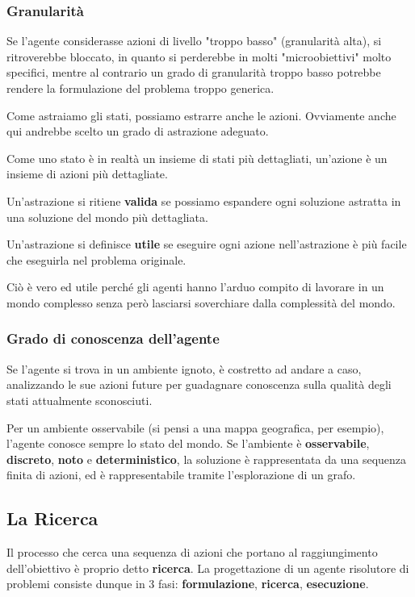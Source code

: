         \subsubsection{Granularità}
            Se l'agente considerasse azioni di livello "troppo basso" (granularità alta), si ritroverebbe bloccato, in quanto si perderebbe in molti "microobiettivi" molto specifici, mentre al contrario un grado di granularità troppo basso potrebbe rendere la formulazione del problema troppo generica.
            
            Come astraiamo gli stati, possiamo estrarre anche le azioni. Ovviamente anche qui andrebbe scelto un grado di astrazione adeguato.
            
            Come uno stato è in realtà un insieme di stati più dettagliati, un'azione è un insieme di azioni più dettagliate.
            
            Un'astrazione si ritiene \textbf{valida} se possiamo espandere ogni soluzione astratta in una soluzione del mondo più dettagliata.
            
            Un'astrazione si definisce \textbf{utile} se eseguire ogni azione nell'astrazione è più facile che eseguirla nel problema originale.
            
            Ciò è vero ed utile perché gli agenti hanno l'arduo compito di lavorare in un mondo complesso senza però lasciarsi soverchiare dalla complessità del mondo.
            
        \subsubsection{Grado di conoscenza dell'agente}
            Se l'agente si trova in un ambiente ignoto, è costretto ad andare a caso, analizzando le sue azioni future per guadagnare conoscenza sulla qualità degli stati attualmente sconosciuti.
            
            Per un ambiente osservabile (si pensi a una mappa geografica, per esempio), l'agente conosce sempre lo stato del mondo. Se l'ambiente è \textbf{osservabile}, \textbf{discreto}, \textbf{noto} e \textbf{deterministico}, la soluzione è rappresentata da una sequenza finita di azioni, ed è rappresentabile tramite l'esplorazione di un grafo.
            
    \subsection{La Ricerca}
        Il processo che cerca una sequenza di azioni che portano al raggiungimento dell'obiettivo è proprio detto \textbf{ricerca}. La progettazione di un agente risolutore di problemi consiste dunque in 3 fasi: \textbf{formulazione}, \textbf{ricerca}, \textbf{esecuzione}.
        
